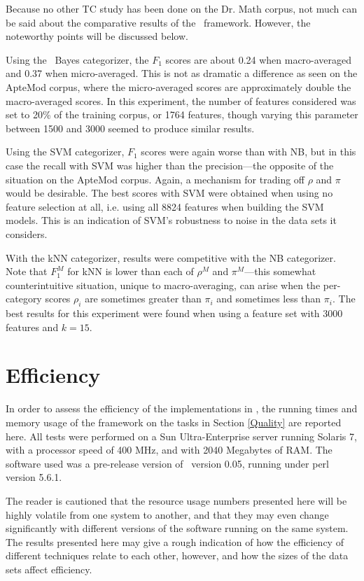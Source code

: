 Because no other TC study has been done on the Dr. Math corpus, not
much can be said about the comparative results of the \aicat\
framework.  However, the noteworthy points will be discussed below.

Using the \naive\ Bayes categorizer, the $F_1$ scores are about 0.24
when macro-averaged and 0.37 when micro-averaged.  This is not as
dramatic a difference as seen on the ApteMod corpus, where the
micro-averaged scores are approximately double the macro-averaged
scores.  In this experiment, the number of features considered was set
to 20\% of the training corpus, or 1764 features, though varying this
parameter between 1500 and 3000 seemed to produce similar results.

Using the SVM categorizer, $F_1$ scores were again worse than with NB,
but in this case the recall with SVM was higher than the
precision---the opposite of the situation on the ApteMod corpus.
Again, a mechanism for trading off $\rho$ and $\pi$ would be
desirable.  The best scores with SVM were obtained when using no
feature selection at all, i.e. using all 8824 features when building
the SVM models.  This is an indication of SVM's robustness to noise in
the data sets it considers.

With the kNN categorizer, results were competitive with the NB
categorizer.  Note that $F_1^M$ for kNN is lower than each of $\rho^M$
and $\pi^M$---this somewhat counterintuitive situation, unique to
macro-averaging, can arise when the per-category scores $\rho_i$ are
sometimes greater than $\pi_i$ and sometimes less than $\pi_i$.  The
best results for this experiment were found when using a feature set
with 3000 features and $k=15$.


\section{Efficiency}
\label{Efficiency}

In order to assess the efficiency of the implementations in \aicat,
the running times and memory usage of the framework on the tasks in
Section \ref{Quality} are reported here.  All tests were performed on
a Sun Ultra-Enterprise server running Solaris 7, with a processor
speed of 400 MHz, and with 2040 Megabytes of RAM.  The software used
was a pre-release version of \aicat\ version 0.05, running under perl
version 5.6.1.

The reader is cautioned that the resource usage numbers presented here
will be highly volatile from one system to another, and that they may
even change significantly with different versions of the software
running on the same system.  The results presented here may give a
rough indication of how the efficiency of different techniques relate
to each other, however, and how the sizes of the data sets affect
efficiency.


